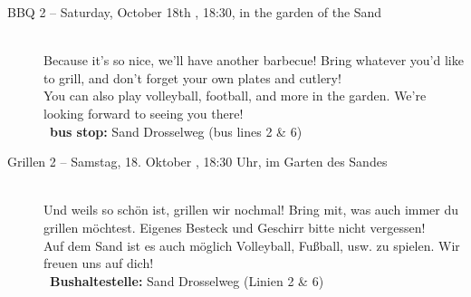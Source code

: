 \begin{description}

\ifml
    \item[BBQ 2 -- Saturday, October 18th \YEAR, 18:30, in the garden of the Sand]~\\
    Because it's so nice, we'll have another barbecue!
    Bring whatever you'd like to grill, and don’t forget your own plates and cutlery!\\
    You can also play volleyball, football, and more in the garden. We’re looking forward to seeing you there!\\
    ~\textbf{bus stop:} Sand Drosselweg (bus lines 2 \& 6)
\else
    \item[Grillen 2 -- Samstag, 18. Oktober \YEAR, 18:30 Uhr, im Garten des Sandes]~\\
    Und weils so schön ist, grillen wir nochmal!
    Bring mit, was auch immer du grillen möchtest. Eigenes Besteck und Geschirr bitte nicht vergessen!\\
    Auf dem Sand ist es auch möglich Volleyball, Fußball, usw. zu spielen. Wir freuen uns auf dich!\\
    ~\textbf{Bushaltestelle:} Sand Drosselweg (Linien 2 \& 6)
\fi



\end{description}
